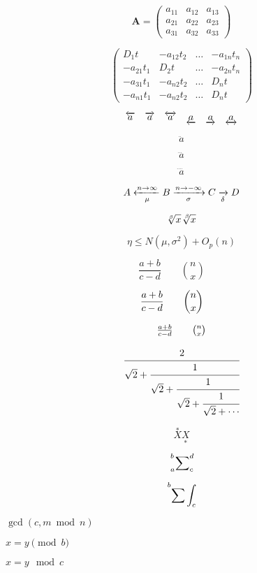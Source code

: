 \documentclass[11pt]{article}
\newcommand{\go}{\longrightarrow}
\begin{document}
$$\pmb{A} = \begin{pmatrix}
a_{11} & a_{12} & a_{13} \\
a_{21} & a_{22} & a_{23} \\
a_{31} & a_{32} & a_{33} 
\end{pmatrix}$$

$$\begin{pmatrix}
D_1t & -a_{12}t_2 & \dots & -a_{1n}t_n \\
-a_{21}t_1 & D_2t & \dots & -a_{2n}t_n \\
-a_{31}t_1 & -a_{n2}t_2 & \dots & D_nt \\
-a_{n1}t_1 & -a_{n2}t_2 & \dots & D_nt
\end{pmatrix}$$

$$\overleftarrow{a} \quad \overrightarrow{a} \quad
\overleftrightarrow{a} \quad
\underleftarrow{a} \quad \underrightarrow{a} \quad
\underleftrightarrow{a}$$

$$\ddot a$$

$$\dddot a$$

$$\ddddot a$$

$$A \xleftarrow[\mu]{n\rightarrow\infty} B \xrightarrow[\sigma]{n\rightarrow -\infty} C \xrightarrow[\delta]{\null}D$$

$$\sqrt[\beta]{x} \sqrt[\leftroot{-2}\uproot{2}\beta]{x}$$

$$\boxed{\eta \leq N(\mu, \sigma^2) + O_p(n)}$$

$$\frac{a+b}{c-d} \qquad \binom{n}{x} \qquad$$

$$\dfrac{a+b}{c-d} \qquad \dbinom{n}{x} \qquad$$

$$\tfrac{a+b}{c-d} \qquad \tbinom{n}{x}$$

$$\cfrac{2}{\sqrt{2} + \cfrac{1}{\sqrt{2} + 
\cfrac{1}{\sqrt{2} + \cfrac{1}{\sqrt{2} + \cdots}}}}$$

$$\overset{*}{X} \underset{*}{X}$$

$$\sideset{_a^b}{_c^d}\sum$$

$$\sideset{_{\null}^b}{_c^{\null}}{\sum\int}$$





$\gcd(c,m \bmod n)$

$x=y \pmod b$

$x=y \mod c$
\end{document}
